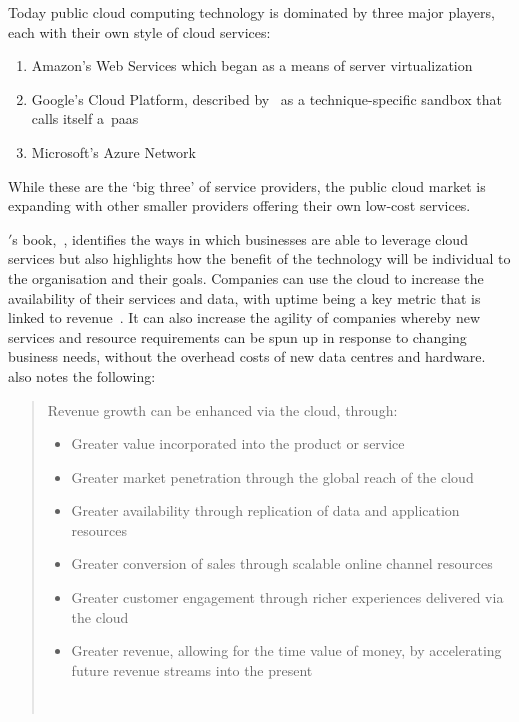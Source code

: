 Today public cloud computing technology is dominated by three major players, each with their own style of cloud services:

\begin{enumerate}
    \item Amazon's Web Services which began as a means of server virtualization~\citep{awsintro}
    \item Google's Cloud Platform, described by~\citet{cc_overview} as a technique-specific sandbox that calls itself a~\gls{paas}~\citep{googlecloudintro}
    \item Microsoft's Azure Network~\citep{azurefundamentals}
\end{enumerate}

While these are the `big three' of service providers, the public cloud market is expanding with other smaller providers offering their own low-cost services.

\citet{weinman2012cloudonomics}\('\)s book,~\textit{}, identifies the ways in which businesses are able to leverage cloud services but also highlights how the benefit of the technology will be individual to the organisation and their goals.
Companies can use the cloud to increase the availability of their services and data,
with uptime being a key metric that is linked to revenue~\citep{weinman2012cloudonomics}.
It can also increase the agility of companies whereby new services and resource requirements can be spun up in response to changing business needs,
without the overhead costs of new data centres and hardware.
\citet{weinman2012cloudonomics} also notes the following:

\begin{quotation}
    Revenue growth can be enhanced via the cloud, through:
    \begin{itemize}
        \item Greater value incorporated into the product or service
        \item Greater market penetration through the global reach of the cloud
        \item Greater availability through replication of data and application resources
        \item Greater conversion of sales through scalable online channel resources
        \item Greater customer engagement through richer experiences delivered via the cloud
        \item Greater revenue, allowing for the time value of money, by accelerating future revenue streams into the present
    \end{itemize}~\citep{weinman2012cloudonomics}
\end{quotation}

